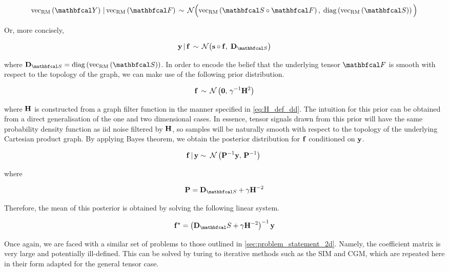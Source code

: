 \begin{equation}
    \vecrm{\Yt} \, | \, \vecrm{\Ft} \, \sim \, \mathcal{N}\Big(\vecrm{\St \circ \Ft}, \; \diag{\vecrm{\St}}\Big)
\end{equation}

Or, more concisely, 

\begin{equation}
    \y \, | \, \f \, \sim \, \mathcal{N}\big(\s \circ \f, \; \D_{\St} \big)
\end{equation}

where $\D_{\St} = \diag{\vecrm{\St}}$. In order to encode the belief that the underlying tensor $\Ft$ is smooth with respect to the topology of the graph, we can make use of the following prior distribution. 

\begin{equation}
    \mathbf{f} \, \sim \, \mathcal{N}\left( \mathbf{0}, \, \gamma^{-1} \mathbf{H}^2 \right) 
\end{equation}

where $\mathbf{H}$ is constructed from a graph filter function in the manner specified in \cref{eq:H_def_dd}. The intuition for this prior can be obtained from a direct generalisation of the one and two dimensional cases. In essence, tensor signals drawn from this prior will have the same probability density function as iid noise filtered by $\mathbf{H}$, so samples will be naturally smooth with respect to the topology of the underlying Cartesian product graph. By applying Bayes theorem, we obtain the posterior distribution for $\mathbf{f}$ conditioned on $\mathbf{y}$. 


\begin{equation}
    \mathbf{f} \, | \, \mathbf{y} \sim \; \mathcal{N}\left(\mathbf{P}^{-1} \mathbf{y}, \, \mathbf{P}^{-1}\right) \;
\end{equation}

where 

\begin{equation}
    \PP = \D_{\St} + \gamma \HH^{-2}
\end{equation}

Therefore, the mean of this posterior is obtained by solving the following linear system.

\begin{equation}
    \label{eq:lin_system_dd}
    \f^{\star} = \left(\D_\St + \gamma \HH^{-2}\right)^{-1} \y
\end{equation}

Once again, we are faced with a similar set of problems to those outlined in \cref{sec:problem_statement_2d}. Namely, the coefficient matrix is very large and potentially ill-defined. This can be solved by turing to iterative methods such as the SIM and CGM, which are repeated here in their form adapted for the general tensor case. 

